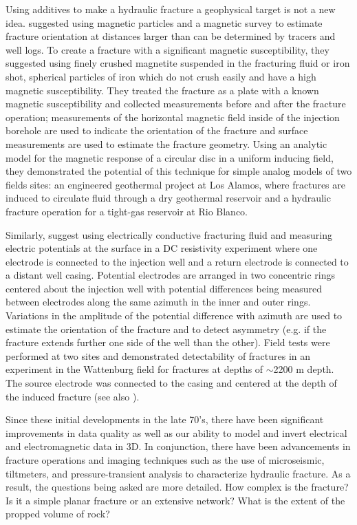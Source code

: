 Using additives to make a hydraulic fracture a geophysical target is not a new idea. \cite{Byerlee1976} suggested using magnetic particles and a magnetic survey to estimate fracture orientation at distances larger than can be determined by tracers and well logs. To create a fracture with a significant magnetic susceptibility, they suggested using finely crushed magnetite suspended in the fracturing fluid or iron shot, spherical particles of iron which do not crush easily and have a high magnetic susceptibility. They treated the fracture as a plate with a known magnetic susceptibility and collected measurements before and after the fracture operation; measurements of the horizontal magnetic field inside of the injection borehole are used to indicate the orientation of the fracture and surface measurements are used to estimate the fracture geometry. Using an analytic model for the magnetic response of a circular disc in a uniform inducing field, they demonstrated the potential of this technique for simple analog models of two fields sites: an engineered geothermal project at Los Alamos, where fractures are induced to circulate fluid through a dry geothermal reservoir and a hydraulic fracture operation for a tight-gas reservoir at Rio Blanco.

Similarly, \cite{Bartel1976} suggest using electrically conductive fracturing fluid and measuring electric potentials at the surface in a DC resistivity experiment where one electrode is connected to the injection well and a return electrode is connected to a distant well casing. Potential electrodes are arranged in two concentric rings centered about the injection well with potential differences being measured between electrodes along the same azimuth in the inner and outer rings. Variations in the amplitude of the potential difference with azimuth are used to estimate the orientation of the fracture and to detect asymmetry (e.g. if the fracture extends further one side of the well than the other). Field tests were performed at two sites and demonstrated detectability of fractures in an experiment in the Wattenburg field for fractures at depths of $\sim$2200 m depth. The source electrode was connected to the casing and centered at the depth of the induced fracture (see also \cite{Smith1978}).

Since these initial developments in the late 70's, there have been significant improvements in data quality as well as our ability to model and invert electrical and electromagnetic data in 3D. In conjunction, there have been advancements in fracture operations and imaging techniques such as the use of microseismic, tiltmeters, and pressure-transient analysis to characterize hydraulic fracture. As a result, the questions being asked are more detailed. How complex is the fracture? Is it a simple planar fracture or an extensive network? What is the extent of the propped volume of rock?

